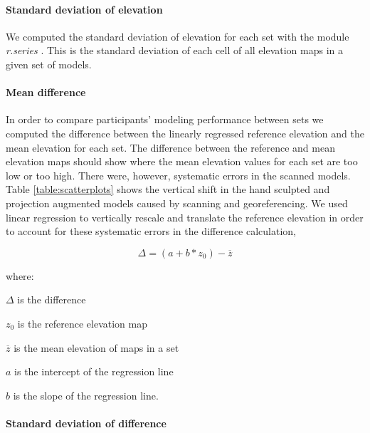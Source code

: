 \documentclass[prodmode,acmtochi]{acmsmall} %
\begin{document}
\paragraph{Standard deviation of elevation}
We computed 
the standard deviation of elevation
for each set
with the module \textit{r.series} \cite{r.series}.
This is the standard deviation of each cell 
of all elevation maps in a given set of models.

\paragraph{Mean difference}
In order to compare participants' modeling performance between sets 
we computed the difference 
between the linearly regressed reference elevation and 
the mean elevation for each set.
%
The difference between the reference and mean elevation maps should show
where the mean elevation values for each set are too low or too high. 
%
There were, however, systematic errors in the scanned models.
%
Table \ref{table:scatterplots} shows the vertical shift 
in the hand sculpted and projection augmented models 
caused by scanning and georeferencing.
%
We used linear regression 
to vertically rescale and translate the reference elevation 
in order to account for these systematic errors
in the difference calculation,

\begin{equation}
\label{eq:regressed_mean_difference}
\Delta = (a + b * z_0) - \overline{z}
\end{equation}

where:

\hspace*{1em} $\Delta$ is the difference

\hspace*{1em} $z_0$ is the reference elevation map

\hspace*{1em} $\overline{z}$ is the mean elevation of maps in a set

\hspace*{1em} $a$ is the intercept of the regression line

\hspace*{1em} $b$ is the slope of the regression line.\\


\paragraph{Standard deviation of difference}
\end{document}
